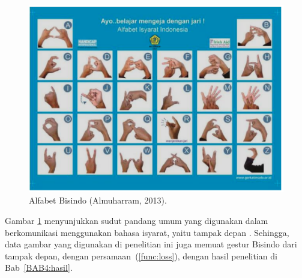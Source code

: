 \lipsum[7]
\begin{center}
\begin{figure}[h]
    \includegraphics[width=\textwidth]{BAB-2/figures/alfabetbisindo.png}	
	    \caption{Alfabet Bisindo (Almuharram, 2013).}
	    \label{gambar:alfabet bisindo}
\end{figure}
\end{center}
Gambar \ref{gambar:alfabet bisindo} menyunjukkan sudut pandang umum yang digunakan dalam berkomunikasi menggunakan bahasa isyarat, yaitu tampak depan \citep{xiong2004_dscForSensorNetworks}. Sehingga, data gambar yang digunakan di penelitian ini juga memuat gestur Bisindo dari tampak depan, dengan persamaan~(\ref{func:loss}), dengan hasil penelitian di Bab~\ref{BAB4:hasil}.